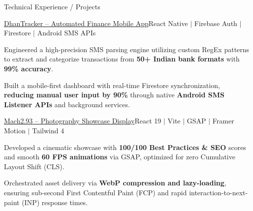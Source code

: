 \documentclass{resume}
\begin{document}
\begin{rSection}{Technical Experience / Projects}
\begin{rSubsection}{\href{https://github.com/suryaansh132004/finance-tracker-app}{DhanTracker -- Automated Finance Mobile App}}{\footnotesize React Native $|$ Firebase Auth $|$ Firestore $|$ Android SMS APIs}{}{}
\item Engineered a high-precision SMS parsing engine utilizing custom RegEx patterns to extract and categorize transactions from \textbf{50+ Indian bank formats} with \textbf{99\% accuracy}.

\item Built a mobile-first dashboard with real-time Firestore synchronization, \textbf{reducing manual user input by 90\%} through native \textbf{Android SMS Listener APIs} and background services.

\end{rSubsection}



\begin{rSubsection}{\href{https://mach283.netlify.app}{Mach2.93 -- Photography Showcase Display}}{\footnotesize React 19 $|$ Vite $|$ GSAP $|$ Framer Motion $|$ Tailwind 4}{}{}\vspace{-4pt} 

\item Developed a cinematic showcase with \textbf{100/100 Best Practices \& SEO} scores and smooth \textbf{60 FPS animations} via GSAP, optimized for zero Cumulative Layout Shift (CLS). 

\item Orchestrated asset delivery via \textbf{WebP compression and lazy-loading}, ensuring sub-second First Contentful Paint (FCP) and rapid interaction-to-next-paint (INP) response times.

\end{rSubsection}



\end{rSection}



\vspace{-2mm}
\end{document}
